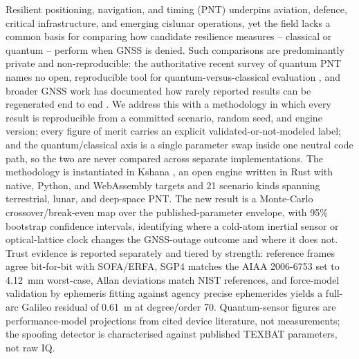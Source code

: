 Resilient positioning, navigation, and timing (PNT) underpins aviation,
defence, critical infrastructure, and emerging cislunar operations, yet the
field lacks a common basis for comparing how candidate resilience measures --
classical or quantum -- perform when GNSS is denied. Such comparisons are
predominantly private and non-reproducible: the authoritative recent survey of
quantum PNT names no open, reproducible tool for quantum-versus-classical
evaluation \citep{quantumpntreview2026}, and broader GNSS work has documented
how rarely reported results can be regenerated end to end
\citep{fernandezprades2018reproducibility}. We address this with a methodology
in which every result is reproducible from a committed scenario, random seed,
and engine version; every figure of merit carries an explicit
validated-or-not-modeled label; and the quantum/classical axis is a single
parameter swap inside one neutral code path, so the two are never compared
across separate implementations. The methodology is instantiated in Kshana
\citep{baweja2026kshana}, an open engine written in Rust with native, Python,
and WebAssembly targets and 21 scenario kinds spanning terrestrial, lunar, and
deep-space PNT. The new result is a Monte-Carlo
crossover/break-even map over the published-parameter envelope, with 95\%
bootstrap confidence intervals, identifying where a cold-atom inertial sensor or
optical-lattice clock changes the GNSS-outage outcome and where it does not.
Trust evidence is reported separately and tiered by strength: reference frames
agree bit-for-bit with SOFA/ERFA, SGP4 matches the AIAA 2006-6753 set to
\SI{4.12}{\milli\metre} worst-case, Allan deviations match NIST references, and
force-model validation by ephemeris fitting against agency precise ephemerides
yields a full-arc Galileo residual of \SI{0.61}{\metre} at degree/order 70.
Quantum-sensor figures are performance-model projections from cited device
literature, not measurements; the spoofing detector is characterised against
published TEXBAT parameters, not raw IQ.
